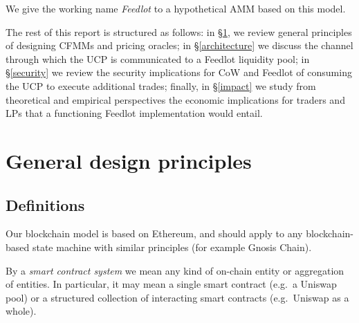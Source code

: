 \documentclass[a4paper,10pt]{article}
\theoremstyle{remark}
\begin{document}
We give the working name \emph{Feedlot} to a hypothetical AMM based on this model.
%

The rest of this report is structured as follows: in \S\ref{general}, we review general principles of designing CFMMs and pricing oracles; 
%
in \S\ref{architecture} we discuss the channel through which the UCP is communicated to a Feedlot liquidity pool; 
%
in \S\ref{security} we review the security implications for CoW and Feedlot of consuming the UCP to execute additional trades;
%
finally, in \S\ref{impact} we study from theoretical and empirical perspectives the economic implications for traders and LPs that a functioning Feedlot implementation would entail.


\section{General design principles}
\label{general}

\subsection{Definitions}

Our blockchain model is based on Ethereum, and should apply to any blockchain-based state machine with similar principles (for example Gnosis Chain).
%

By a \emph{smart contract system} we mean any kind of on-chain entity or aggregation of entities. In particular, it may mean a single smart contract (e.g.~a Uniswap pool) or a structured collection of interacting smart contracts (e.g.~Uniswap as a whole).
\end{document}
